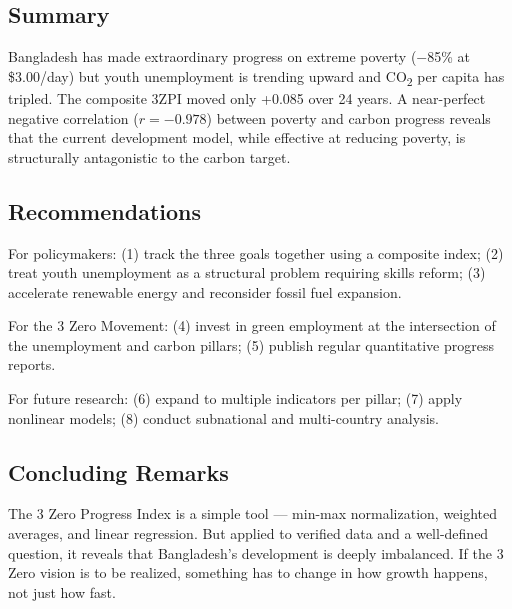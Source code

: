 \documentclass[12pt,a4paper]{article}
\begin{document}
\subsection{Summary}

Bangladesh has made extraordinary progress on extreme poverty ($-$85\% at \$3.00/day) but youth unemployment is trending upward and CO\textsubscript{2} per capita has tripled. The composite 3ZPI moved only +0.085 over 24 years. A near-perfect negative correlation ($r = -0.978$) between poverty and carbon progress reveals that the current development model, while effective at reducing poverty, is structurally antagonistic to the carbon target.

\subsection{Recommendations}

For policymakers: (1) track the three goals together using a composite index; (2) treat youth unemployment as a structural problem requiring skills reform; (3) accelerate renewable energy and reconsider fossil fuel expansion.

For the 3 Zero Movement: (4) invest in green employment at the intersection of the unemployment and carbon pillars; (5) publish regular quantitative progress reports.

For future research: (6) expand to multiple indicators per pillar; (7) apply nonlinear models; (8) conduct subnational and multi-country analysis.

\subsection{Concluding Remarks}

The 3 Zero Progress Index is a simple tool --- min-max normalization, weighted averages, and linear regression. But applied to verified data and a well-defined question, it reveals that Bangladesh's development is deeply imbalanced. If the 3 Zero vision is to be realized, something has to change in how growth happens, not just how fast.



\end{document}
